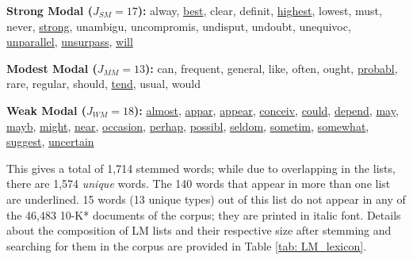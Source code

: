 {\textbf{Strong Modal ($J_{SM} = 17$):} \textsf{alway, \underline{best}, clear, definit, \underline{highest}, lowest, must, never, \underline{strong}, unambigu, uncompromis, undisput, undoubt, unequivoc, \underline{unparallel}, \underline{unsurpass}, \underline{will}}

\textbf{Modest Modal ($J_{MM} = 13$):} \textsf{can, frequent, general, like, often, ought, \underline{probabl}, rare, regular, should, \underline{tend}, usual, would}

\textbf{Weak Modal ($J_{WM} = 18$):} \textsf{\underline{almost}, \underline{appar}, \underline{appear}, \underline{conceiv}, \underline{could}, \underline{depend}, \underline{may}, \underline{mayb}, \underline{might}, \underline{near}, \underline{occasion}, \underline{perhap}, \underline{possibl}, \underline{seldom}, \underline{sometim}, \underline{somewhat}, \underline{suggest}, \underline{uncertain}}}

This gives a total of 1,714 stemmed words; while due to overlapping in the lists, there are 1,574 \textit{unique} words. The 140 words that appear in more than one list are underlined. 15 words (13 unique types) out of this list do not appear in any of the 46,483 10-K* documents of the corpus; they are printed in italic font. Details about the composition of LM lists and their respective size after stemming and searching for them in the corpus are provided in Table \ref{tab: LM_lexicon}. 

\clearpage



